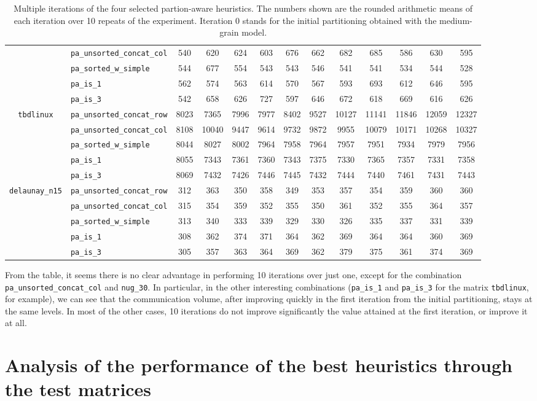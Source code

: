 \begin{sidewaystable}[h]
\begin{tabular}{|c|l|c||c|c|c|c|c|c|c|c|c|c|}
		&\verb|pa_unsorted_concat_col| & 540 &  620 & 624 & 603 & 676 & 662 & 682 & 685 & 586 & 630 & 595 \\ 
		&\verb|pa_sorted_w_simple| &544 & 677 & 554 & 543 & 543 & 546 & 541 & 541 & 534 & 544 & 528 \\
		&\verb|pa_is_1| & 562 & 574 & 563 & 614 & 570 & 567 & 593 & 693 & 612 & 646 & 595 \\
		&\verb|pa_is_3| &542 & 658 & 626 & 727 & 597 & 646 & 672 & 618 & 669 & 616 & 626 \\ \hline
		\multirow{5}{*}{\texttt{tbdlinux}}		&\verb|pa_unsorted_concat_row| & 8023 & 7365  & 7996  & 7977  & 8402  & 9527 & 10127 & 11141 & 11846 & 12059 & 12327 \\ 
		&\verb|pa_unsorted_concat_col| & 8108 & 10040  & 9447  & 9614  & 9732  & 9872  & 9955 & 10079 & 10171 & 10268 & 10327 \\ 
		&\verb|pa_sorted_w_simple| & 8044 & 8027 & 8002 & 7964 & 7958 & 7964 & 7957 & 7951 & 7934 & 7979 & 7956 \\
		&\verb|pa_is_1| & 8055 & 7343 & 7361 & 7360 & 7343 & 7375 & 7330 & 7365 & 7357 & 7331 & 7358 \\
		&\verb|pa_is_3| & 8069 & 7432 & 7426 & 7446 & 7445 & 7432 & 7444 & 7440 & 7461 & 7431 & 7443 \\ \hline
		\multirow{5}{*}{\texttt{delaunay\_n15}}		&\verb|pa_unsorted_concat_row| & 312 & 363 &  350 &  358 &  349 &  353 &  357 &  354  & 359 &  360 &  360 \\ 
		&\verb|pa_unsorted_concat_col| & 315 & 354 & 359 & 352 & 355 & 350 & 361 & 352 & 355 & 364 & 357 \\ 
		&\verb|pa_sorted_w_simple| & 313 & 340 & 333 & 339 & 329 & 330 & 326 & 335 & 337 & 331 & 339 \\
		&\verb|pa_is_1| & 308 & 362 & 374 & 371 & 364 & 362 & 369 & 364 & 364 & 360 & 369 \\
		&\verb|pa_is_3| & 305 & 357 & 363 & 364 & 369 & 362 & 379 & 375 & 361 & 374 & 369 \\\hline
		\end{tabular}
	\caption{Multiple iterations of the four selected partion-aware heuristics. The numbers shown are the rounded arithmetic means of each iteration over 10 repeats of the experiment. Iteration 0 stands for the initial partitioning obtained with the medium-grain model.} \label{tab:iterations}
\end{sidewaystable}

From the table, it seems there is no clear advantage in performing 10 iterations over just one, except for the combination \verb|pa_unsorted_concat_col| and \verb|nug_30|. In particular, in the other interesting combinations (\verb|pa_is_1| and \verb|pa_is_3| for the matrix \verb|tbdlinux|, for example), we can see that the communication volume, after improving quickly in the first iteration from the initial partitioning, stays at the same levels. In most of the other cases, 10 iterations do not improve significantly the value attained at the first iteration, or improve it at all.

\section{Analysis of the performance of the best heuristics through the test matrices} \label{sec:final_tests}



